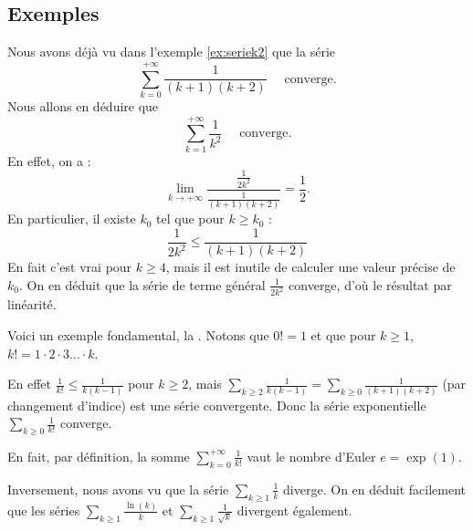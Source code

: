 \documentclass[class=report,crop=false]{standalone}
\begin{document}
\subsection{Exemples}

\begin{exemple}
Nous avons déjà vu dans l'exemple \ref{ex:seriek2} que la
série
$$
\sum_{k=0}^{+\infty} \frac{1}{(k+1)(k+2)}
\quad\text{ converge.}
$$
Nous allons en déduire que
$$
\sum_{k=1}^{+\infty} \frac{1}{k^2}
\quad\text{ converge.}
$$
En effet, on a :
$$
\lim_{k\to+\infty}
\frac{\frac{1}{2k^2}}{\frac{1}{(k+1)(k+2)}}=\frac{1}{2}. 
$$
En particulier, il existe $k_0$ tel que pour $k \ge k_0$ :
$$
\frac{1}{2k^2} \le \frac{1}{(k+1)(k+2)}
$$
En fait c'est vrai pour $k \ge 4$, mais il est inutile de calculer une
valeur précise de $k_0$. On en déduit que la série de terme
général $\frac{1}{2k^2}$ converge, d'où le résultat par
linéarité.  
\end{exemple}


\begin{exemple}
Voici un exemple fondamental, la .
Notons que $0!=1$ et que pour $k\ge 1$, $k!=1\cdot 2\cdot 3\dots \cdot k$.

En effet 
$\frac{1}{k!}\le \frac{1}{k(k-1)}$ pour $k \ge 2$,
mais $\sum_{k \ge 2}\frac{1}{k(k-1)} = \sum_{k\ge0} \frac{1}{(k+1)(k+2)}$ (par changement d'indice)
est une série convergente.
Donc la série exponentielle $\sum_{k\ge 0} \frac{1}{k!}$ converge.

En fait, par définition, la somme $\sum_{k=0}^{+\infty} \frac{1}{k!}$ 
vaut le nombre d'Euler $e = \exp(1)$.
\end{exemple}


\begin{exemple}
Inversement, nous avons vu que la série $\sum_{k\ge1} \frac{1}{k}$
diverge. On en déduit facilement que les séries 
$\sum_{k\ge1} \frac{\ln(k)}{k}$ et $\sum_{k\ge1} \frac{1}{\sqrt{k}}$ divergent également.  
\end{exemple}
\end{document}
